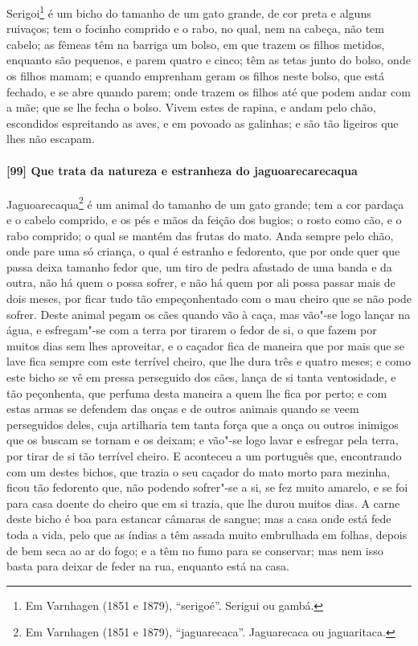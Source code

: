 \begin{linenumbers}
Serigoi\footnote{ Em Varnhagen (1851 e 1879), ``serigoé''. Serigui ou gambá.} é um bicho
do tamanho de um gato grande, de cor preta e alguns ruivaços; tem o focinho comprido e o
rabo, no qual, nem na cabeça, não tem cabelo; as fêmeas têm na barriga um bolso, em que
trazem os filhos metidos, enquanto são pequenos, e parem quatro e cinco; têm as tetas
junto do bolso, onde os filhos mamam; e quando emprenham geram os filhos neste bolso, que
está fechado, e se abre quando parem; onde trazem os filhos até que podem andar com a mãe;
que se lhe fecha o bolso. Vivem estes de rapina, e andam pelo chão, escondidos espreitando
as aves, e em povoado as galinhas; e são tão ligeiros que lhes não escapam.

\paragraph{[99] Que trata da natureza e estranheza do jaguoarecarecaqua}\quad
Jaguoarecaqua\footnote{ Em Varnhagen (1851 e 1879), ``jaguarecaca''. Jaguarecaca ou
jaguaritaca.} é um animal do tamanho de um gato grande; tem a cor pardaça e o cabelo
comprido, e os pés e mãos da feição dos bugios; o rosto como cão, e o rabo comprido; o
qual se mantém das frutas do mato. Anda sempre pelo chão, onde pare uma só criança, o qual
é estranho e fedorento, que por onde quer que passa deixa tamanho fedor que, um tiro de
pedra afastado de uma banda e da outra, não há quem o possa sofrer, e não há quem por ali
possa passar mais de dois meses, por ficar tudo tão empeçonhentado com o mau cheiro que se
não pode sofrer. Deste animal pegam os cães quando vão à caça, mas vão"-se logo lançar na
água, e esfregam"-se com a terra por tirarem o fedor de si, o que fazem por muitos dias sem
lhes aproveitar, e o caçador fica de maneira que por mais que se lave fica sempre com este
terrível cheiro, que lhe dura três e quatro meses; e como este bicho se vê em pressa
perseguido dos cães, lança de si tanta ventosidade, e tão peçonhenta, que perfuma desta
maneira a quem lhe fica por perto; e com estas armas se defendem das onças e de outros
animais quando se veem perseguidos deles, cuja artilharia tem tanta força que a onça ou
outros inimigos que os buscam se tornam e os deixam; e vão"-se logo lavar e esfregar pela
terra, por tirar de si tão terrível cheiro. E aconteceu a um português que, encontrando
com um destes bichos, que trazia o seu caçador do mato morto para mezinha, ficou tão
fedorento que, não podendo sofrer"-se a si, se fez muito amarelo, e se foi para casa doente
do cheiro que em si trazia, que lhe durou muitos dias. A carne deste bicho é boa para
estancar câmaras de sangue; mas a casa onde está fede toda a vida, pelo que as índias a
têm assada muito embrulhada em folhas, depois de bem seca ao ar do fogo; e a têm no fumo
para se conservar; mas nem isso basta para deixar de feder na rua, enquanto está na casa.


\end{linenumbers}
